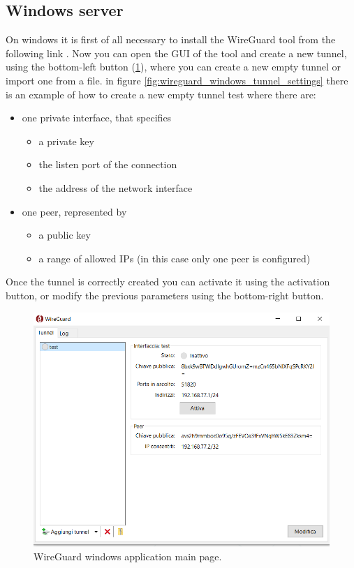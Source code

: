 \subsection{Windows server}
On windows it is first of all necessary to install the WireGuard tool from the following link \cite{WireGuardDownload}.
Now you can open the GUI of the tool and create a new tunnel, using the bottom-left button (\ref{fig:wireguard_windows}), where you can create a new empty tunnel or import one from a file. in figure \ref{fig:wireguard_windows_tunnel_settings} there is an example of how to create a new empty tunnel test where there are:
\begin{itemize}
    \item one private interface, that specifies 
    \begin{itemize}
        \item a private key
        \item the listen port of the connection
        \item the address of the network interface
    \end{itemize}
    \item one peer, represented by
    \begin{itemize}
        \item a public key
        \item a range of allowed IPs (in this case only one peer is configured)
    \end{itemize}
\end{itemize}
Once the tunnel is correctly created you can activate it using the activation button, or modify the previous parameters using the bottom-right button.

\begin{figure}[H]
\vspace{0.5cm}
\centering
\includegraphics[width=\textwidth/3*2]{images/wireguard_windows.png}
\caption{WireGuard windows application main page.}
\label{fig:wireguard_windows} %
\end{figure}

